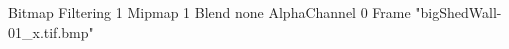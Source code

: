 {Bitmap
	{Filtering 1}
	{Mipmap 1}
	{Blend none}
	{AlphaChannel 0}
	{Frame "bigShedWall-01_x.tif.bmp"}
}
